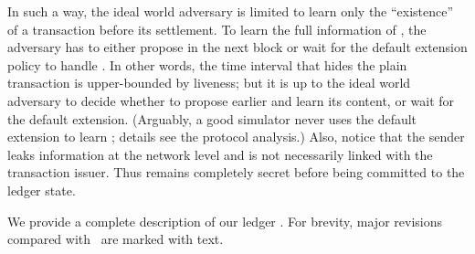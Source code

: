 In such a way, the ideal world adversary is limited to learn only the ``existence'' of a transaction \tx before its settlement.
%
To learn the full information of \tx, the adversary has to either propose \tx in the next block or wait for the default extension policy to handle \tx.
%
In other words, the time interval that \funcFairLedger hides the plain transaction is upper-bounded by liveness; but it is up to the ideal world adversary to decide whether to propose \tx earlier and learn its content, or wait for the default extension.
%
(Arguably, a good simulator never uses the default extension to learn \tx; details see the protocol analysis.)
%
Also, notice that the sender \party leaks information at the network level and is not necessarily linked with the transaction issuer.
%
Thus \tx remains completely secret before being committed to the ledger state.

We provide a complete description of our ledger \funcFairLedger.
%
For brevity, major revisions compared with~\cite{C:BMTZ17} are marked with  text.


